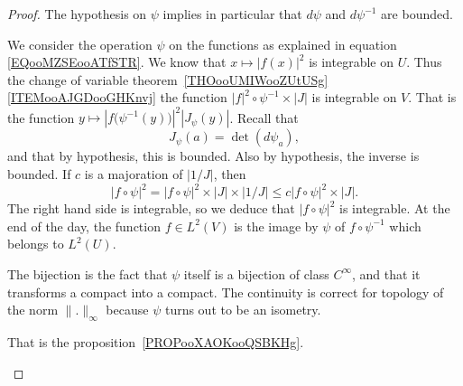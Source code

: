 \begin{proof}
	The hypothesis on \( \psi\) implies in particular that \( d\psi\) and \( d\psi^{-1}\) are bounded.
	\begin{subproof}
		We consider the operation \( \psi\) on the functions as explained in equation \eqref{EQooMZSEooATfSTR}. We know that \( x\mapsto | f(x) |^2\) is integrable on \( U\). Thus the change of variable theorem~\ref{THOooUMIWooZUtUSg}\ref{ITEMooAJGDooGHKnvj} the function \( | f |^2\circ\psi^{-1}\times | J |\) is integrable on \( V\). That is the function \( y\mapsto | f\big( \psi^{-1}(y) \big) |^2| J_{\psi}(y) |\). Recall that
		\begin{equation}
			J_{\psi}(a)=\det(d\psi_a),
		\end{equation}
		and that by hypothesis, this is bounded. Also by hypothesis, the inverse is bounded. If \( c\) is a majoration of \( | 1/J |\), then
		\begin{equation}
			| f\circ\psi |^2=| f\circ\psi |^2\times | J |\times | 1/J |\leq c| f\circ\psi |^2\times | J |.
		\end{equation}
		The right hand side is integrable, so we deduce that \( | f\circ\psi |^2\) is integrable. At the end of the day, the function \( f\in L^2(V)\) is the image by \( \psi\) of \( f\circ\psi^{-1}\) which belongs to \( L^2(U)\).

		The bijection is the fact that \( \psi\) itself is a bijection of class \(  C^{\infty}\), and that it transforms a compact into a compact. The continuity is correct for topology of the norm \( \| . \|_{\infty}\) because \( \psi\) turns out to be an isometry.

		That is the proposition~\ref{PROPooXAOKooQSBKHg}.



\end{subproof}
\end{proof}
